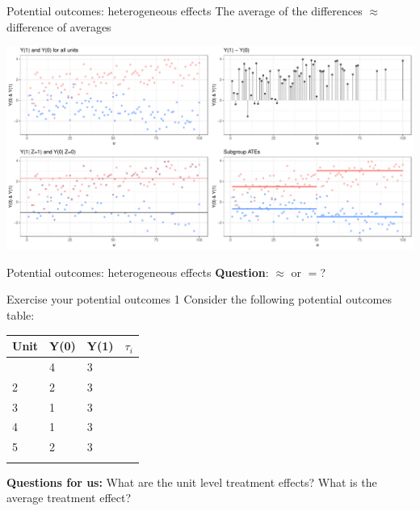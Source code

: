 \documentclass[
  11pt,
  ignorenonframetext,
]{beamer}
\begin{document}
\begin{frame}{Potential outcomes: heterogeneous effects}
\protect\hypertarget{potential-outcomes-heterogeneous-effects}{}
The average of the differences \(\approx\) difference of averages

\includegraphics{0_lectures_files/figure-beamer/unnamed-chunk-223-1.pdf}
\end{frame}

\begin{frame}{Potential outcomes: heterogeneous effects}
\protect\hypertarget{potential-outcomes-heterogeneous-effects-1}{}
\textbf{Question}: \(\approx\) or \(=\)?
\end{frame}

\begin{frame}{Exercise your potential outcomes 1}
\protect\hypertarget{exercise-your-potential-outcomes-1}{}
Consider the following potential outcomes table:

\begin{longtable}[]{@{}llll@{}}
\toprule\noalign{}
Unit & Y(0) & Y(1) & \(\tau_i\) \\
\midrule\noalign{}
\endhead
1 & 4 & 3 & \\
2 & 2 & 3 & \\
3 & 1 & 3 & \\
4 & 1 & 3 & \\
5 & 2 & 3 & \\
\bottomrule\noalign{}
\end{longtable}

\textbf{Questions for us:} What are the unit level treatment effects?
What is the average treatment effect?
\end{frame}
\end{document}
